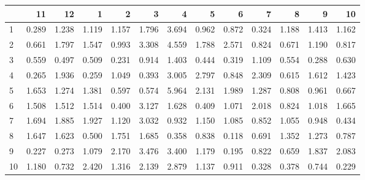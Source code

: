 \begin{tabular}{lrrrrrrrrrrrr}
\toprule
{} &     11 &     12 &     1  &     2  &     3  &     4  &     5  &     6  &     7  &     8  &     9  &     10 \\
\midrule
1  &  0.289 &  1.238 &  1.119 &  1.157 &  1.796 &  3.694 &  0.962 &  0.872 &  0.324 &  1.188 &  1.413 &  1.162 \\
2  &  0.661 &  1.797 &  1.547 &  0.993 &  3.308 &  4.559 &  1.788 &  2.571 &  0.824 &  0.671 &  1.190 &  0.817 \\
3  &  0.559 &  0.497 &  0.509 &  0.231 &  0.914 &  1.403 &  0.444 &  0.319 &  1.109 &  0.554 &  0.288 &  0.630 \\
4  &  0.265 &  1.936 &  0.259 &  1.049 &  0.393 &  3.005 &  2.797 &  0.848 &  2.309 &  0.615 &  1.612 &  1.423 \\
5  &  1.653 &  1.274 &  1.381 &  0.597 &  0.574 &  5.964 &  2.131 &  1.989 &  1.287 &  0.808 &  0.961 &  0.667 \\
6  &  1.508 &  1.512 &  1.514 &  0.400 &  3.127 &  1.628 &  0.409 &  1.071 &  2.018 &  0.824 &  1.018 &  1.665 \\
7  &  1.694 &  1.885 &  1.927 &  1.120 &  3.032 &  0.932 &  1.150 &  1.085 &  0.852 &  1.055 &  0.948 &  0.434 \\
8  &  1.647 &  1.623 &  0.500 &  1.751 &  1.685 &  0.358 &  0.838 &  0.118 &  0.691 &  1.352 &  1.273 &  0.787 \\
9  &  0.227 &  0.273 &  1.079 &  2.170 &  3.476 &  3.400 &  1.179 &  0.195 &  0.822 &  0.659 &  1.837 &  2.083 \\
10 &  1.180 &  0.732 &  2.420 &  1.316 &  2.139 &  2.879 &  1.137 &  0.911 &  0.328 &  0.378 &  0.744 &  0.229 \\
\bottomrule
\end{tabular}
